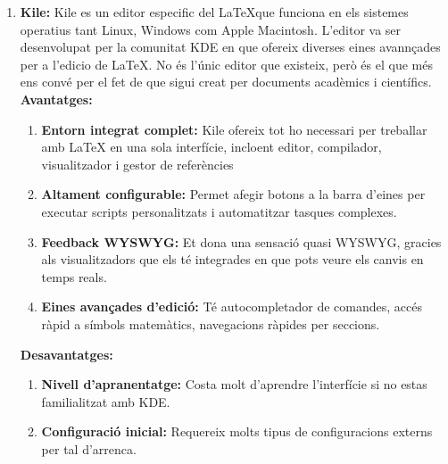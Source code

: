 \begin{enumerate}
\begin{enumerate}
          \item \textbf{Kile:} Kile es un editor especific del \LaTeX  que funciona en els sistemes operatius tant Linux, Windows com Apple Macintosh. L'editor va ser desenvolupat per la comunitat  KDE\cite{KDE} en que ofereix diverses eines avannçades per a l'edicio de LaTeX. No és l'únic editor que existeix, però és el que més ens convé per el fet de que sigui creat per documents acadèmics i científics.\\
          \textbf{Avantatges:}
              \begin{enumerate}
              \item \textbf{Entorn integrat complet:} Kile ofereix tot ho necessari per treballar amb LaTeX en una sola interfície, incloent editor, compilador, visualitzador i gestor de referències
              \item \textbf{Altament configurable: } Permet afegir botons a la barra d'eines per executar scripts personalitzats i automatitzar tasques complexes.
              \item \textbf{Feedback WYSWYG:} Et dona una sensació quasi WYSWYG, gracies als visualitzadors que els té integrades en que pots veure els canvis en temps reals.
              \item \textbf{Eines avançades d'edició:} Té autocompletador de comandes, accés ràpid a símbols matemàtics, navegacions ràpides per seccions.
              \end{enumerate}

          \textbf{Desavantatges:}
              \begin{enumerate}
               \item \textbf{Nivell d'apranentatge:} Costa molt d'aprendre l'interfície si no estas familialitzat amb KDE.
               \item \textbf{Configuració inicial:} Requereix molts tipus de configuracions externs per tal d'arrenca.
              \end{enumerate}

\end{enumerate}
\end{enumerate}
